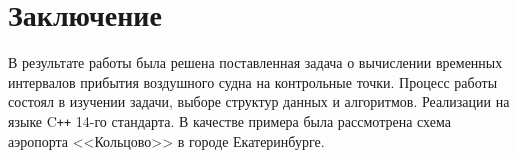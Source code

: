 \documentclass[12pt]{article}
\theoremstyle{plain}
\begin{document}
\newpage

\section*{Заключение}

В результате работы была решена поставленная задача о вычислении временных интервалов прибытия воздушного судна на контрольные точки. Процесс работы состоял в изучении задачи, выборе структур данных и алгоритмов. Реализации на языке C{}\verb!++! 14-го стандарта. В качестве примера была рассмотрена схема аэропорта <<Кольцово>> в городе Екатеринбурге.

\newpage
\end{document}
